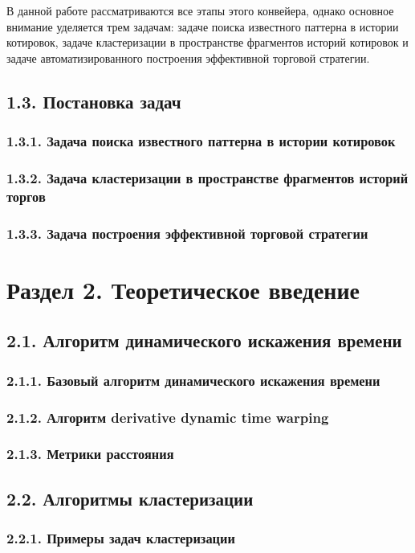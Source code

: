 \documentclass[12pt]{article}
\begin{document}
В данной работе рассматриваются все этапы этого конвейера, однако основное внимание уделяется трем задачам: задаче поиска известного паттерна в истории котировок, задаче кластеризации в пространстве фрагментов историй котировок и задаче автоматизированного построения эффективной торговой стратегии.
\subsection{1.3. Постановка задач}
\subsubsection{1.3.1. Задача поиска известного паттерна в истории котировок}
\subsubsection{1.3.2. Задача кластеризации в пространстве фрагментов историй торгов}
\subsubsection{1.3.3. Задача построения эффективной торговой стратегии}
\section{Раздел 2. Теоретическое введение}
\subsection{2.1. Алгоритм динамического искажения времени}
\subsubsection{2.1.1. Базовый алгоритм динамического искажения времени}
\subsubsection{2.1.2. Алгоритм derivative dynamic time warping}
\subsubsection{2.1.3. Метрики расстояния}
\newpage{}
\subsection{2.2. Алгоритмы кластеризации}
\subsubsection{2.2.1. Примеры задач кластеризации}
\end{document}
